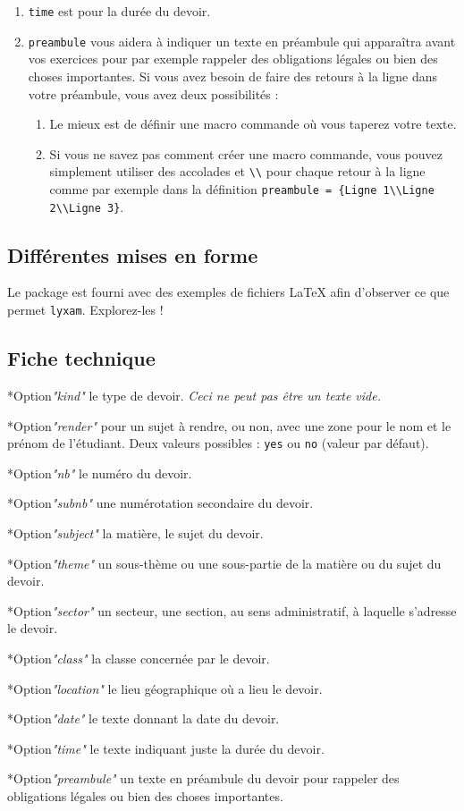 \documentclass[12pt,a4paper]{article}
\makeatletter
\theoremstyle{definition}
\newcommand\IDmacro{\@ifstar{\@IDmacroStar}{\@IDmacroNoStar}}
\newcommand\@IDmacroNoStar[3]{%
        \texttt{%
        	\textbackslash#1%
        	\IfStrEq{#2}{0}{}{%
        		\,\,[#2 Option%
				\IfStrEq{#2}{1}{}{s}]%
			}%
    	    \IfStrEq{#3}{}{}{%
	    		\,\,(#3 Argument%
				\IfStrEq{#3}{1}{}{s})%
			}
	   	}
        \immediate\write\tempfile{macro@#1@#2@#3}%
    }
\newcommand\@IDmacroStar[2]{%
        \@IDmacroNoStar{#1}{0}{#2}%
    }
\newcommand\@IDoptarg{\@ifstar{\@IDoptargStar}{\@IDoptargNoStar}}
\newcommand\@IDoptargStar[2]{%
    	\vspace{0.5em}
		--- \texttt{#1%
			\IfStrEq{#2}{}{:}{\,#2:}%
		}%
	}
\newcommand\@IDoptargNoStar[2]{%
    	\IfStrEq{#2}{}{%
			\@IDoptargStar{#1}{}%
		}{%
			\@IDoptargStar{#1}{\##2}%
		}%
	}
\newcommand\IDkey[1]{%
    	\@IDoptarg*{Option}{{\itshape "#1"}}%
	}
\makeatother
\begin{document}
\begin{enumerate}
	\item \verb+time+ est pour la durée du devoir.

	\item \verb+preambule+ vous aidera à indiquer un texte en préambule qui apparaîtra avant vos exercices pour par exemple rappeler des obligations légales ou bien des choses importantes.
	 Si vous avez besoin de faire des retours à la ligne dans votre préambule, vous avez deux possibilités :

	 \begin{enumerate}
		\item Le mieux est de définir une macro commande où vous taperez votre texte.

		\item Si vous ne savez pas comment créer une macro commande, vous pouvez simplement utiliser des accolades et \verb+\\+ pour chaque retour à la ligne comme par exemple dans la définition \verb+preambule = {Ligne 1\\Ligne 2\\Ligne 3}+.
	\end{enumerate}
\end{enumerate}


	\subsection{Différentes mises en forme}

Le package est fourni avec des exemples de fichiers \LaTeX{} afin d'observer ce que permet \verb+lyxam+. Explorez-les !


	\subsection{Fiche technique}

\IDmacro{exam}{12}{0}

\IDkey{kind} le type de devoir. \emph{Ceci ne peut pas être un texte vide.}

\IDkey{render} pour un sujet à rendre, ou non, avec une zone pour le nom et le prénom de l'étudiant. Deux valeurs possibles : \verb+yes+ ou \verb+no+ (valeur par défaut).

\IDkey{nb} le numéro du devoir.

\IDkey{subnb} une numérotation secondaire du devoir.

\IDkey{subject} la matière, le sujet du devoir.

\IDkey{theme} un sous-thème ou une sous-partie de la matière ou du sujet du devoir.

\IDkey{sector} un secteur, une section, au sens administratif, à laquelle s'adresse le devoir.

\IDkey{class} la classe concernée par le devoir.

\IDkey{location} le lieu géographique où a lieu le devoir.

\IDkey{date} le texte donnant la date du devoir.

\IDkey{time} le texte indiquant juste la durée du devoir.

\IDkey{preambule} un texte en préambule du devoir pour rappeler des obligations légales ou bien des choses importantes.
\end{document}

